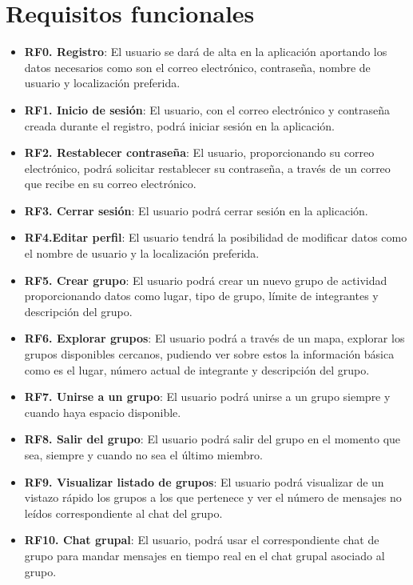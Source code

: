 \section{Requisitos funcionales}
        \begin{itemize}
            \item \textbf{RF0. Registro}: El usuario se dará de alta en la aplicación aportando los datos necesarios como son el correo electrónico, contraseña, nombre de usuario y localización preferida.
            \item \textbf{RF1. Inicio de sesión}: El usuario, con el correo electrónico y contraseña creada durante el registro, podrá iniciar sesión en la aplicación.
            \item \textbf{RF2. Restablecer contraseña}: El usuario, proporcionando su correo electrónico, podrá solicitar restablecer su contraseña, a través de un correo que recibe en su correo electrónico.
            \item \textbf{RF3. Cerrar sesión}: El usuario podrá cerrar sesión en la aplicación.
            \item \textbf{RF4.Editar perfil}: El usuario tendrá la posibilidad de modificar datos como el nombre de usuario y la localización preferida.
            \item \textbf{RF5. Crear grupo}: El usuario podrá crear un nuevo grupo de actividad proporcionando datos como lugar, tipo de grupo, límite de integrantes y descripción del grupo.
            \item \textbf{RF6. Explorar grupos}: El usuario podrá a través de un mapa, explorar los grupos disponibles cercanos, pudiendo ver sobre estos la información básica como es el lugar, número actual de integrante y descripción del grupo.
            \item \textbf{RF7. Unirse a un grupo}: El usuario podrá unirse a un grupo siempre y cuando haya espacio disponible.
            \item \textbf{RF8. Salir del grupo}: El usuario podrá salir del grupo en el momento que sea, siempre y cuando no sea el último miembro.
            \item \textbf{RF9. Visualizar listado de grupos}: El usuario podrá visualizar de un vistazo rápido los grupos a los que pertenece y ver el número de mensajes no leídos correspondiente al chat del grupo.
            \item \textbf{RF10. Chat grupal}: El usuario, podrá usar el correspondiente chat de grupo para mandar mensajes en tiempo real en el chat grupal asociado al grupo.
        \end{itemize}

